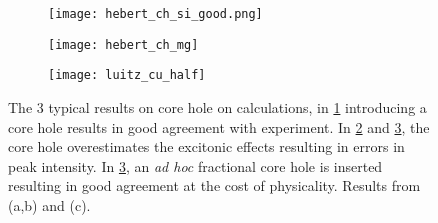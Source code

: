\begin{figure}
	\begin{subfigure}{0.45\textwidth}
		\texttt{[image: hebert\_ch\_si\_good.png]} 
		\caption{}
		\label{hebert-ch-good}
	\end{subfigure}
    \hfill
	\begin{subfigure}{0.45\textwidth}
		\texttt{[image: hebert\_ch\_mg]} 
		\caption{}
		\label{hebert-ch-bad}
	\end{subfigure}
	\vspace{1cm}
	\begin{subfigure}{0.45\textwidth}
		\texttt{[image: luitz\_cu\_half]} 
		\caption{}
		\label{luitz_half}
	\end{subfigure}
	\centering
	\caption{The 3 typical results on core hole on calculations, in \ref{hebert-ch-good} introducing a core hole results in good agreement with experiment.  In \ref{hebert-ch-bad} and \ref{luitz_half}, the core hole overestimates the excitonic effects resulting in errors in peak intensity.  In \ref{luitz_half}, an \textit{ad hoc} fractional core hole is inserted resulting in good agreement at the cost of physicality. Results from \cite{hebert_improvement_2003} (a,b) and \cite{luitz_partial_2001} (c).}
	\label{core-hole-types}
	
\end{figure}

\newpage




